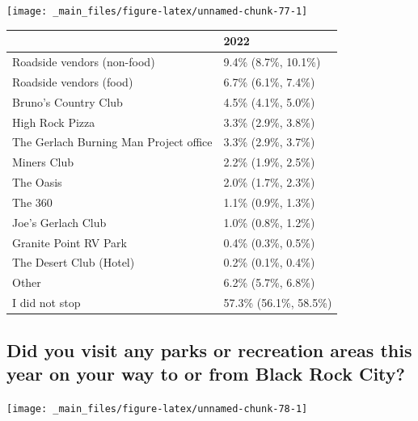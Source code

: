 \documentclass[
]{book}
\begin{document}
\texttt{[image: \_main\_files/figure-latex/unnamed-chunk-77-1]}

\begin{table}
\centering
\begin{tabular}[t]{>{}l|>{}l}
\hline
  & 2022\\
\hline
Roadside vendors (non-food) & 9.4\% (8.7\%, 10.1\%)\\
\hline
Roadside vendors (food) & 6.7\% (6.1\%, 7.4\%)\\
\hline
Bruno's Country Club & 4.5\% (4.1\%, 5.0\%)\\
\hline
High Rock Pizza & 3.3\% (2.9\%, 3.8\%)\\
\hline
The Gerlach Burning Man Project office & 3.3\% (2.9\%, 3.7\%)\\
\hline
Miners Club & 2.2\% (1.9\%, 2.5\%)\\
\hline
The Oasis & 2.0\% (1.7\%, 2.3\%)\\
\hline
The 360 & 1.1\% (0.9\%, 1.3\%)\\
\hline
Joe's Gerlach Club & 1.0\% (0.8\%, 1.2\%)\\
\hline
Granite Point RV Park & 0.4\% (0.3\%, 0.5\%)\\
\hline
The Desert Club (Hotel) & 0.2\% (0.1\%, 0.4\%)\\
\hline
Other & 6.2\% (5.7\%, 6.8\%)\\
\hline
I did not stop & 57.3\% (56.1\%, 58.5\%)\\
\hline
\end{tabular}
\end{table}

\hypertarget{did-you-visit-any-parks-or-recreation-areas-this-year-on-your-way-to-or-from-black-rock-city}{%
\subsection{Did you visit any parks or recreation areas this year on your way to or from Black Rock City?}\label{did-you-visit-any-parks-or-recreation-areas-this-year-on-your-way-to-or-from-black-rock-city}}

\texttt{[image: \_main\_files/figure-latex/unnamed-chunk-78-1]}
\end{document}
